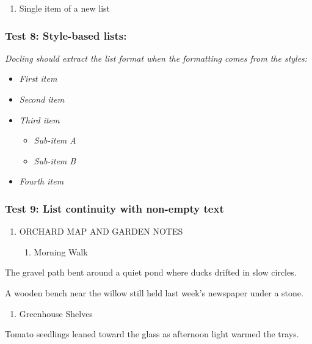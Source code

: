 \documentclass[11pt,a4paper]{article}
\begin{document}
\begin{enumerate}
\item Single item of a new list
\end{enumerate}

\subsubsection{Test 8: Style-based lists:}

\textit{Docling should extract the list format when the formatting comes from the styles:}

\begin{itemize}
\item \textit{First item}
\item \textit{Second item}
\item \textit{Third item}
  \begin{itemize}
\item \textit{Sub-item A}
\item \textit{Sub-item B}
  \end{itemize}
\item \textit{Fourth item}
\end{itemize}

\subsubsection{Test 9: List continuity with non-empty text}

\begin{enumerate}
\item ORCHARD MAP AND GARDEN NOTES
  \begin{enumerate}
\item Morning Walk
  \end{enumerate}
\end{enumerate}

The gravel path bent around a quiet pond where ducks drifted in slow circles.

A wooden bench near the willow still held last week's newspaper under a stone.

\begin{enumerate}
\item Greenhouse Shelves
\end{enumerate}

Tomato seedlings leaned toward the glass as afternoon light warmed the trays.
\end{document}
